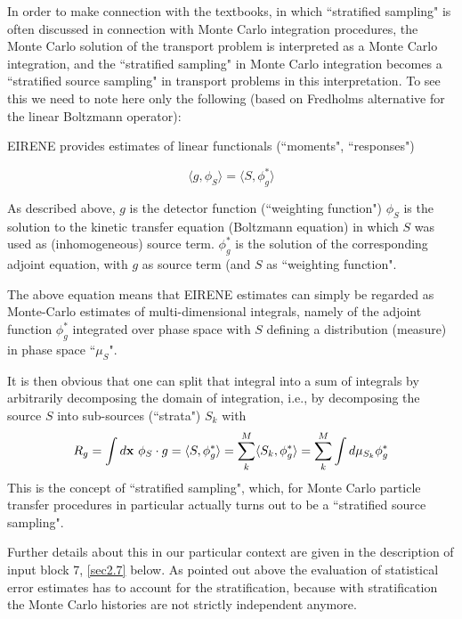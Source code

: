 In order to make connection with the textbooks, in which ``stratified sampling"
is often discussed in connection with Monte Carlo integration procedures, the
Monte Carlo solution of the transport problem is interpreted as a Monte Carlo
integration, and the ``stratified sampling" in Monte Carlo integration becomes
a ``stratified source sampling" in transport problems in this interpretation.
To see this we need to note here only the following (based on Fredholms
alternative for the linear Boltzmann operator):

EIRENE provides estimates of linear functionals (``moments", ``responses")

\begin{equation}
  \label{fredhalt} \langle g,\phi_S\rangle = \langle
  S,\phi^*_g\rangle
\end{equation}

As described above, $g$ is the detector function (``weighting function")
$\phi_S $ is the solution to the kinetic transfer equation (Boltzmann equation)
in which $S$ was used as (inhomogeneous) source term.
$\phi^*_g$ is the solution of the corresponding adjoint equation, with $g$ as
source term (and $S$ as ``weighting function".

The above equation means that EIRENE estimates can simply be regarded as
Monte-Carlo estimates of multi-dimensional integrals, namely of the adjoint
function $\phi^*_g$ integrated over phase space with $S$ defining a
distribution (measure) in phase space ``$\mu_S$".

It is then obvious that one can split that integral into a sum of integrals by
arbitrarily decomposing the domain of integration, i.e., by decomposing the
source $S$ into sub-sources (``strata") $S_k$ with
\begin{equation}
  R_g = \int
  d\mathbf{x}~ \phi_S \cdot g = \langle S,\phi^*_g\rangle =\sum_k^{M} \langle
  S_k,\phi^*_g\rangle = \sum_k^{M} \int d\mu_{S_k} \phi^*_g
\end{equation}
This
is the concept of ``stratified sampling", which, for Monte Carlo particle
transfer procedures in particular actually turns out to be a ``stratified
source sampling".

Further details about this in our particular context are given in the
description of input block 7, \cref{sec2.7} below.
As pointed out above the evaluation of statistical error estimates has to
account for the stratification, because with stratification  the Monte Carlo
histories are not strictly independent anymore.

